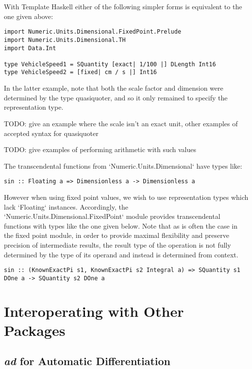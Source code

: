 \documentclass[11pt]{report}
\newcommand{\packagename}[1]{\textit{#1}}
\begin{document}
With Template Haskell either of the following simpler forms is equivalent to the one given above:

\begin{lstlisting}
import Numeric.Units.Dimensional.FixedPoint.Prelude
import Numeric.Units.Dimensional.TH
import Data.Int

type VehicleSpeed1 = SQuantity [exact| 1/100 |] DLength Int16
type VehicleSpeed2 = [fixed| cm / s |] Int16
\end{lstlisting}

In the latter example, note that both the scale factor and dimension were determined by the type quasiquoter, and so it
only remained to specify the representation type.

TODO: give an example where the scale isn't an exact unit, other examples of accepted syntax for quasiquoter

TODO: give examples of performing arithmetic with such values

The transcendental functions from `Numeric.Units.Dimensional` have types like:

\begin{lstlisting}
sin :: Floating a => Dimensionless a -> Dimensionless a
\end{lstlisting}

However when using fixed point values, we wish to use representation types which lack `Floating` instances. Accordingly,
the `Numeric.Units.Dimensional.FixedPoint` module provides transcendental functions with types like the one given below.
Note that as is often the case in the fixed point module, in order to provide maximal flexibility and preserve precision of
intermediate results, the result type of the operation is not fully determined by the type of its operand and instead is
determined from context.

\begin{lstlisting}
sin :: (KnownExactPi s1, KnownExactPi s2 Integral a) => SQuantity s1 DOne a -> SQuantity s2 DOne a
\end{lstlisting}

\chapter{Interoperating with Other Packages}

\section{\packagename{ad} for Automatic Differentiation}
\end{document}
